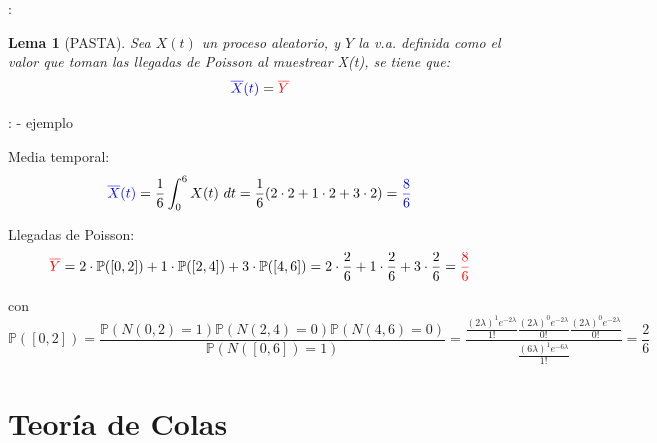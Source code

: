 \documentclass[xcolor={x11names}]{beamer}
\newtheorem{lema}{Lema}[section]
\newcommand{\red}[1]{{\color{red}#1}}
\newcommand{\blue}[1]{{\color{blue}#1}}
\begin{document}
\begin{frame}{\secname: \subsecname}
    \begin{lema}[PASTA]
        Sea \blue{$X(t)$} un proceso aleatorio,
        y \red{$Y$} la v.a. definida como el
        valor que toman las llegadas de Poisson
        al muestrear \blue{X(t)}, se tiene que:
        \begin{equation}
            \blue{\overline{X}(t)} = \red{\overline{Y}}
        \end{equation}
    \end{lema}
\end{frame}




\begin{frame}{\secname: \subsecname - ejemplo}

    Media temporal: 
    \begin{equation*}
        \blue{\overline{X}(t)}=\frac{1}{6}\int_0^6 X(t)\ dt =\frac{1}{6} (2\cdot2 + 1\cdot2 + 3\cdot2) = \blue{\frac{8}{6}}
    \end{equation*}

    Llegadas de Poisson:
    \begin{equation*}
        \red{\overline{Y}} = 2\cdot\mathbb{P}([0,2]) + 1 \cdot\mathbb{P}([2,4]) + 3\cdot \mathbb{P}([4,6])=2\cdot\frac{2}{6} + 1 \cdot\frac{2}{6}+ 3\cdot\frac{2}{6}=\red{\frac{8}{6}}
    \end{equation*}

    \vfill

    \begin{figure}
        \resizebox{.4\textwidth}{!}{%
        }
    \end{figure}

    \vfill

    con
    \begin{equation*}%
        \scriptstyle
        \mathbb{P}([0,2])=\frac{\mathbb{P}(N(0,2)=1)\mathbb{P}(N(2,4)=0)\mathbb{P}(N(4,6)=0)}{\mathbb{P}(N([0,6])=1)}
                          =\frac{\frac{(2\lambda)^1e^{-2\lambda}}{1!} \frac{(2\lambda)^0e^{-2\lambda}}{0!} \frac{(2\lambda)^0e^{-2\lambda}}{0!} }{\frac{(6\lambda)^1e^{-6\lambda}}{1!}}=\frac{2}{6}%
    \end{equation*}%
\end{frame}



\section{Teoría de Colas}
\end{document}

